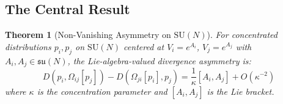 \documentclass[11pt,a4paper]{article}
\newtheorem{theorem}{Theorem}[section]
\newcommand{\suN}{\mathfrak{su}(N)}
\newcommand{\SUN}{\mathrm{SU}(N)}
\begin{document}
\subsection{The Central Result}

\begin{theorem}[Non-Vanishing Asymmetry on $\SUN$]\label{thm:quantum}
For concentrated distributions $p_i, p_j$ on $\SUN$ centered at $V_i = e^{A_i}$, $V_j = e^{A_j}$ with $A_i, A_j \in \suN$, the Lie-algebra-valued divergence asymmetry is:
\begin{equation}
    \boxed{D(p_i, \Omega_{ij}[p_j]) - D(\Omega_{ji}[p_i], p_j) = \frac{1}{\kappa}[A_i, A_j] + O(\kappa^{-2})}
\end{equation}
where $\kappa$ is the concentration parameter and $[A_i, A_j]$ is the Lie bracket.
\end{theorem}
\end{document}

